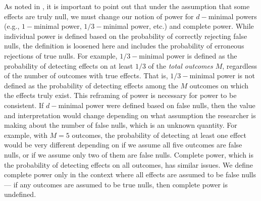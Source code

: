 \documentclass[
]{jss}
\begin{document}
As noted in \citet{Porter2018}, it is important to point out that under
the assumption that some effects are truly null, we must change our
notion of power for \(d-\)minimal powers (e.g., \(1-\)minimal power,
\(1/3-\)minimal power, etc.) and complete power. While individual power
is defined based on the probability of correctly rejecting false nulls,
the definition is loosened here and includes the probability of
erroneous rejections of true nulls. For example, \(1/3-\)minimal power
is defined as the probability of detecting effects on at least \(1/3\)
of the \emph{total outcomes \(M\)}, regardless of the number of outcomes
with true effects. That is, \(1/3-\)minimal power is not defined as the
probability of detecting effects among the \(M\) outcomes on which the
effects truly exist. This reframing of power is necessary for power to
be consistent. If \(d-\)minimal power were defined based on false nulls,
then the value and interpretation would change depending on what
assumption the researcher is making about the number of false nulls,
which is an unknown quantity. For example, with \(M = 5\) outcomes, the
probability of detecting at least one effect would be very different
depending on if we assume all five outcomes are false nulls, or if we
assume only two of them are false nulls. Complete power, which is the
probability of detecting effects on all outcomes, has similar issues. We
define complete power only in the context where all effects are assumed
to be false nulls --- if any outcomes are assumed to be true nulls, then
complete power is undefined.
\end{document}
